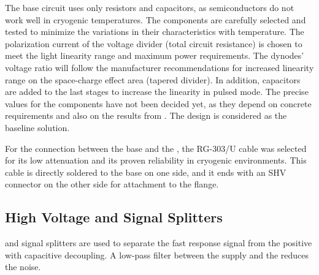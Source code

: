 The  base circuit uses only resistors and capacitors, as semiconductors do not work well in cryogenic temperatures. The components are carefully selected and tested to minimize the variations in their characteristics with temperature. The polarization current of the voltage divider (total circuit resistance) is chosen to meet the  light linearity range and maximum power requirements. The dynodes' voltage ratio will follow the manufacturer recommendations for increased linearity range on the space-charge effect area (tapered divider). In addition, capacitors are added to the last stages to increase the  linearity in pulsed mode. The precise values for the components have not been decided yet, as they depend on concrete requirements and also on the results from . The  %
design is considered as the baseline solution.

For the connection between the  base and the \fdth, the RG-303/U cable was selected for its low attenuation and its proven reliability in cryogenic environments. %
This cable is directly soldered to the  base on one side, and it ends with an SHV connector on the other side for attachment to the flange. 

\subsection{High Voltage and Signal Splitters}
\label{sec:fddp-pd-4.2}

 and signal splitters %
are used to separate the fast  response signal from the positive  with capacitive decoupling. %
A low-pass filter between the  supply and the  %
reduces the noise.

